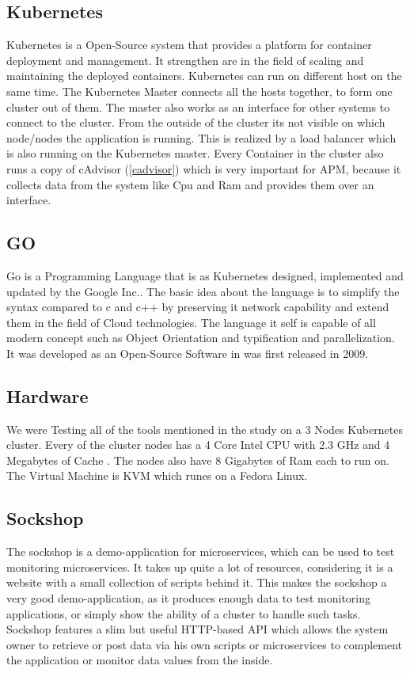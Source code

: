 \subsection{Kubernetes}
Kubernetes is a Open-Source system that provides a platform for container deployment and management. It strengthen are in the field of scaling and maintaining the deployed containers. Kubernetes can run on different host on the same time. The Kubernetes Master connects all the hosts together, to form one cluster out of them. The master also works as an interface for other systems to connect to the cluster. From the outside of the cluster its not visible on which node/nodes the application is running. This is realized by a load balancer which is also running on the Kubernetes master. Every Container in the cluster also runs a copy of cAdvisor (\ref{cadvisor}) which is very important for APM, because it collects data from the system like Cpu and Ram and provides them over an interface.
\subsection{GO}
Go is a Programming Language that is as Kubernetes designed, implemented and updated by the Google Inc.. The basic idea about the language is to simplify the syntax compared to c and c++ by preserving it network capability and extend them in the field of Cloud technologies. The language it self is capable of all modern concept such as Object Orientation and typification and parallelization. It was developed as an Open-Source Software in was first released in 2009.  

\subsection{Hardware}
We were Testing all of the tools mentioned in the study on a 3 Nodes Kubernetes cluster. Every of the cluster nodes has a 4 Core Intel CPU with 2.3 GHz and 4 Megabytes of Cache . The nodes also have 8 Gigabytes of Ram  each to run on. The Virtual Machine is KVM which runes on a Fedora Linux.

\subsection{Sockshop}
The sockshop is a demo-application for microservices, which can be used to test monitoring microservices. It takes up quite a lot of resources, considering it is a website with a small collection of scripts behind it. This makes the sockshop a very good demo-application, as it produces enough data to test monitoring applications, or simply show the ability of a cluster to handle such tasks.
Sockshop features a slim but useful HTTP-based API which allows the system owner to retrieve or post data via his own scripts or microservices to complement the application or monitor data values from the inside.

